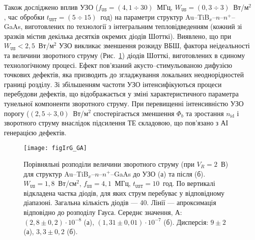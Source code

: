 Також досліджено вплив УЗО
($f_\mathtt{US}=(4,1\div30)$~МГц, $W_\mathtt{US}=(0,3\div3)$~Вт/м$^2$, час обробки $t_\mathtt{UST}=(5\div15)$~год) на параметри структур
Au--TiB$_x$--$n$--$n^+$--GaAs, виготовлених
по технології з інтегральним тепловідведенням (кожний зі зразків містив декілька десятків окремих діодів Шотткі).
Виявлено, що при $W_\mathtt{US}<2,5$~Вт/м$^2$ УЗО викликає зменшення розкиду ВБШ, фактора неідеальності та величини зворотного струму (Рис.~\ref{figIrG_GA})
діодів Шотткі, виготовлених в єдиному технологічному процесі.
Ефект пов'язаний акусто--стимульованою дифузією точкових дефектів, яка призводить до згладжування локальних неоднорідностей границі розділу.
Зі збільшенням частоти УЗО інтенсифікуються процеси перебудови дефектів, що відображається у зміні характеристичного  параметра тунельної компоненти зворотного
струму.
При перевищенні інтенсивністю УЗО порогу ($(2,5\div3,0)$~Вт/м$^2$ спостерігається зменшення $\Phi_b$ та зростання $n_\mathrm{id}$ і зворотного струму внаслідок підсилення ТЕ складовою, що пов'язано з АІ генерацією дефектів.

\begin{figure}
\center
\texttt{[image: figIrG\_GA]}%
\caption{\label{figIrG_GA}
Порівняльні розподіли величини зворотного струму (при $V_R=2$~В)
для структур Au--TiB$_x$--$n$--$n^+$--GaAs до УЗО (а) та після (б).
$W_\mathtt{US}=1,8$~Вт/см$^2$, $f_\mathtt{US}=4,1$~МГц, $t_\mathtt{UST}=10$~год.
По вертикалі відкладена частка діодів, для яких струм перебуває у відповідному діапазоні.
Загальна кількість діодів --- 40.
Лінії --- апроксимація відповідно до розподілу Гауса.
Середнє значення, А:
$(2,8\pm0,2)\cdot10^{-8}$ (а),
$(1,31\pm0,01)\cdot10^{-7}$ (б).
Дисперсія:
$9\pm2$ (а),
$3,3\pm0,2$ (б).
}
\end{figure}

